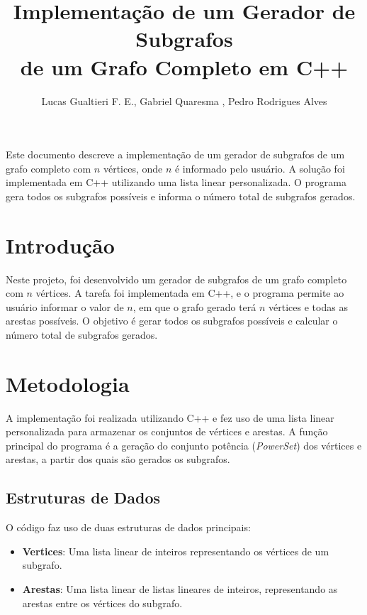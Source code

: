 \documentclass[12pt]{article}
\title { Implementação de um Gerador de Subgrafos \\ de um Grafo Completo em C++ }
\author {Lucas Gualtieri F. E.\inst{1}, Gabriel Quaresma \inst{1}, Pedro Rodrigues Alves \inst{1} }
\begin{document}
 

\maketitle

\begin{resumo}
    Este documento descreve a implementação de um gerador de subgrafos de um grafo completo com \(n\) vértices, onde \(n\) é informado pelo usuário. A solução foi implementada em C++ utilizando uma lista linear personalizada. O programa gera todos os subgrafos possíveis e informa o número total de subgrafos gerados.
\end{resumo}

\section{Introdução}
    Neste projeto, foi desenvolvido um gerador de subgrafos de um grafo completo com \(n\) vértices. A tarefa foi implementada em C++, e o programa permite ao usuário informar o valor de \(n\), em que o grafo gerado terá \(n\) vértices e todas as arestas possíveis. O objetivo é gerar todos os subgrafos possíveis e calcular o número total de subgrafos gerados.

\section{Metodologia}
    A implementação foi realizada utilizando C++ e fez uso de uma lista linear personalizada para armazenar os conjuntos de vértices e arestas. A função principal do programa é a geração do conjunto potência (\textit{PowerSet}) dos vértices e arestas, a partir dos quais são gerados os subgrafos.

\subsection{Estruturas de Dados}
O código faz uso de duas estruturas de dados principais:
\begin{itemize}
    \item \textbf{Vertices}: Uma lista linear de inteiros representando os vértices de um subgrafo.
    \item \textbf{Arestas}: Uma lista linear de listas lineares de inteiros, representando as arestas entre os vértices do subgrafo.
\end{itemize}
\end{document}
